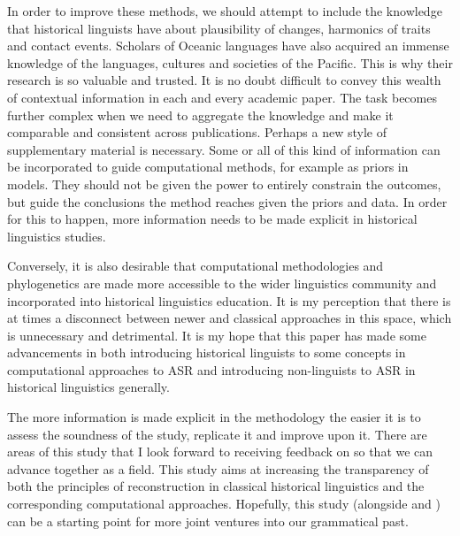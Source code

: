 \documentclass[12pt,letterpaper]{article}
\begin{document}
In order to improve these methods, we should attempt to include the knowledge that historical linguists have about plausibility of changes, harmonics of traits and contact events. Scholars of Oceanic languages have also acquired an immense knowledge of the languages, cultures and societies of the Pacific. This is why their research is so valuable and trusted. It is no doubt difficult to convey this wealth of contextual information in each and every academic paper. The task becomes further complex when we need to aggregate the knowledge and make it comparable and consistent across publications. Perhaps a new style of supplementary material is necessary. Some or all of this kind of information can be incorporated to guide computational methods, for example as priors in models. They should not be given the power to entirely constrain the outcomes, but guide the conclusions the method reaches given the priors and data. In order for this to happen, more information needs to be made explicit in historical linguistics studies.

Conversely, it is also desirable that computational methodologies and phylogenetics are made more accessible to the wider linguistics community and incorporated into historical linguistics education. It is my perception that there is at times a disconnect between newer and classical approaches in this space, which is unnecessary and detrimental. It is my hope that this paper has made some advancements in both introducing historical linguists to some concepts in computational approaches to ASR and introducing non-linguists to ASR in historical linguistics generally.

The more information is made explicit in the methodology the easier it is to assess the soundness of the study, replicate it and improve upon it. There are areas of this study that I look forward to receiving feedback on so that we can advance together as a field. This study aims at increasing the transparency of both the principles of reconstruction in classical historical linguistics and the corresponding computational approaches. Hopefully, this study (alongside \citet{carling2021reconstructing} and \citet{goldstein_2022}) can be a starting point for more joint ventures into our grammatical past.




\end{document}
